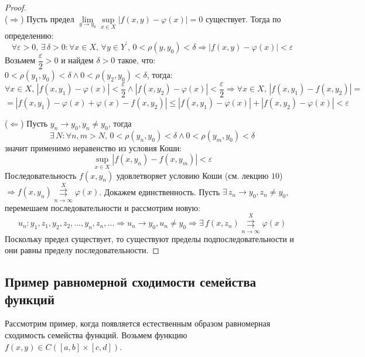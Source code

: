 \documentclass[12pt]{article}
\newcommand{\VE}{\varepsilon}
\theoremstyle{definition}
\newcommand{\uconvm}[2]{\overset{#1}{\underset{#2}{\rightrightarrows}}}
\begin{document}
\begin{proof}\hfill\\
	($\Rightarrow$) Пусть предел $\lim\limits_{y \to y_0} \sup\limits_{x \in X}|f(x,y) - \varphi(x)| = 0$ существует. Тогда по определению:
	$$
		\forall \VE > 0, \, \exists \, \delta > 0 \colon \forall x \in X, \, \forall y \in Y^\prime, \, 0 < \rho(y,y_0) < \delta \Rightarrow |f(x,y) - \varphi(x)| < \VE
	$$
	Возьмем $\dfrac{\VE}{2} > 0$ и найдем $\delta > 0$ такое, что: $0 < \rho(y_1,y_0) < \delta \wedge 0 < \rho(y_2,y_0) < \delta$, тогда:
	$$
		\forall x \in X, \,  |f(x,y_1) - \varphi(x)| < \dfrac{\VE}{2} \wedge |f(x,y_2) - \varphi(x)| < \dfrac{\VE}{2} \Rightarrow \forall x \in X, \,  |f(x,y_1) - f(x,y_2)| =
	$$ 
	$$
		= |f(x,y_1) - \varphi(x) + \varphi(x) - f(x,y_2)| \leq |f(x,y_1) - \varphi(x)| + |f(x,y_2) - \varphi(x)| < \VE
	$$
	
	($\Leftarrow$) Пусть $y_n \to y_0, y_n \neq y_0$, тогда 
	$$
		\exists \, N \colon \forall n,m > N,\, 0 < \rho(y_n, y_0) < \delta \wedge 0 < \rho(y_m, y_0) < \delta
	$$ 
	значит применимо неравенство из условия Коши:
	$$
		\sup\limits_{x \in X}|f(x,y_n) - f(x,y_m)| < \VE
	$$
	Последовательность $f(x,y_n)$ удовлетворяет условию Коши (см. лекцию $10$) $\Rightarrow f(x,y_n)\uconvm{X}{n \to \infty}\varphi(x)$. Докажем единственность. Пусть $\exists \, z_n \to y_0, z_n \neq y_0$, перемешаем последовательности и рассмотрим новую:
	$$
		u_n \colon y_1, z_1, y_2, z_2, \dotsc , y_n, z_n, \dotsc \Rightarrow u_n \to y_0, u_n \neq y_0 \Rightarrow \exists \, f(x,z_n)\uconvm{X}{n \to \infty}\varphi(x)
	$$
	Поскольку предел существует, то существуют пределы подпоследовательности и они равны пределу последовательности.
\end{proof}

\subsection*{Пример равномерной сходимости семейства функций}
Рассмотрим пример, когда появляется естественным образом равномерная сходимость семейства функций. Возьмем функцию $f(x,y) \in C\left([a,b]\times [c,d]\right)$.
\end{document}
